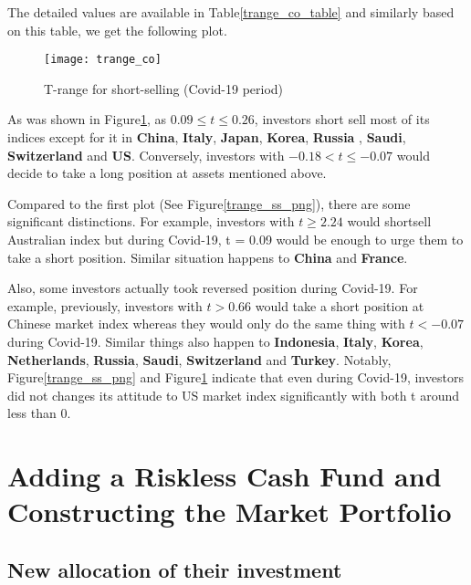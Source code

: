 \documentclass[
]{article}
\begin{document}
The detailed values are available in Table\ref{trange_co_table} and
similarly based on this table, we get the following plot.

\begin{figure}[!htb]
\texttt{[image: trange\_co]}
\caption{T-range for short-selling (Covid-19 period)}\label{trange_co_png}
\end{figure}

As was shown in Figure\ref{trange_co_png}, as \(0.09 \leq t \leq 0.26\),
investors short sell most of its indices except for it in
\textbf{China}, \textbf{Italy}, \textbf{Japan}, \textbf{Korea},
\textbf{Russia} , \textbf{Saudi}, \textbf{Switzerland} and \textbf{US}.
Conversely, investors with \(-0.18< t\leq -0.07\) would decide to take a
long position at assets mentioned above.

Compared to the first plot (See Figure\ref{trange_ss_png}), there are
some significant distinctions. For example, investors with
\(t\geq 2.24\) would shortsell Australian index but during Covid-19, t =
0.09 would be enough to urge them to take a short position. Similar
situation happens to \textbf{China} and \textbf{France}.

Also, some investors actually took reversed position during Covid-19.
For example, previously, investors with \(t>0.66\) would take a short
position at Chinese market index whereas they would only do the same
thing with \(t<-0.07\) during Covid-19. Similar things also happen to
\textbf{Indonesia}, \textbf{Italy}, \textbf{Korea},
\textbf{Netherlands}, \textbf{Russia}, \textbf{Saudi},
\textbf{Switzerland} and \textbf{Turkey}. Notably,
Figure\ref{trange_ss_png} and Figure\ref{trange_co_png} indicate that
even during Covid-19, investors did not changes its attitude to US
market index significantly with both t around less than 0.

\hypertarget{adding-a-riskless-cash-fund-and-constructing-the-market-portfolio}{%
\section{Adding a Riskless Cash Fund and Constructing the Market
Portfolio}\label{adding-a-riskless-cash-fund-and-constructing-the-market-portfolio}}

\hypertarget{new-allocation-of-their-investment}{%
\subsection{New allocation of their
investment}\label{new-allocation-of-their-investment}}
\end{document}
